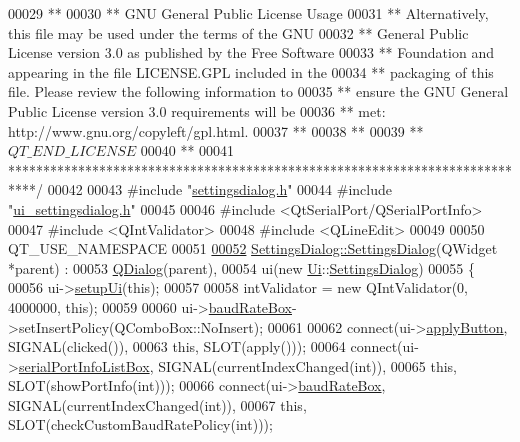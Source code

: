 \begin{DoxyCode}
00029 \textcolor{comment}{**}
00030 \textcolor{comment}{** GNU General Public License Usage}
00031 \textcolor{comment}{** Alternatively, this file may be used under the terms of the GNU}
00032 \textcolor{comment}{** General Public License version 3.0 as published by the Free Software}
00033 \textcolor{comment}{** Foundation and appearing in the file LICENSE.GPL included in the}
00034 \textcolor{comment}{** packaging of this file.  Please review the following information to}
00035 \textcolor{comment}{** ensure the GNU General Public License version 3.0 requirements will be}
00036 \textcolor{comment}{** met: http://www.gnu.org/copyleft/gpl.html.}
00037 \textcolor{comment}{**}
00038 \textcolor{comment}{**}
00039 \textcolor{comment}{** $QT\_END\_LICENSE$}
00040 \textcolor{comment}{**}
00041 \textcolor{comment}{****************************************************************************/}
00042 
00043 \textcolor{preprocessor}{#include "\hyperlink{a00045}{settingsdialog.h}"}
00044 \textcolor{preprocessor}{#include "\hyperlink{a00054}{ui\_settingsdialog.h}"}
00045 
00046 \textcolor{preprocessor}{#include <QtSerialPort/QSerialPortInfo>}
00047 \textcolor{preprocessor}{#include <QIntValidator>}
00048 \textcolor{preprocessor}{#include <QLineEdit>}
00049 
00050 QT\_USE\_NAMESPACE
00051 
\hypertarget{a00044_source_l00052}{}\hyperlink{a00022_abf4568621eef32ca85b919f2209cdc42}{00052} \hyperlink{a00022_abf4568621eef32ca85b919f2209cdc42}{SettingsDialog::SettingsDialog}(QWidget *parent) :
00053     \hyperlink{a00009}{QDialog}(parent),
00054     ui(new \hyperlink{a00055}{Ui}::\hyperlink{a00022}{SettingsDialog})
00055 \{
00056     ui->\hyperlink{a00029_a4666ab89748eeb11cdb95d857bd02c6e}{setupUi}(\textcolor{keyword}{this});
00057 
00058     intValidator = \textcolor{keyword}{new} QIntValidator(0, 4000000, \textcolor{keyword}{this});
00059 
00060     ui->\hyperlink{a00029_a766a61db4a8c72219543f7c096ae5601}{baudRateBox}->setInsertPolicy(QComboBox::NoInsert);
00061 
00062     connect(ui->\hyperlink{a00029_adc885543c05d0026019ec678b4d08c5c}{applyButton}, SIGNAL(clicked()),
00063             \textcolor{keyword}{this}, SLOT(apply()));
00064     connect(ui->\hyperlink{a00029_a323eca0d6d4b94d2d41c7737fe8b2282}{serialPortInfoListBox}, SIGNAL(currentIndexChanged(\textcolor{keywordtype}{int})),
00065             \textcolor{keyword}{this}, SLOT(showPortInfo(\textcolor{keywordtype}{int})));
00066     connect(ui->\hyperlink{a00029_a766a61db4a8c72219543f7c096ae5601}{baudRateBox}, SIGNAL(currentIndexChanged(\textcolor{keywordtype}{int})),
00067             \textcolor{keyword}{this}, SLOT(checkCustomBaudRatePolicy(\textcolor{keywordtype}{int})));

\end{DoxyCode}
